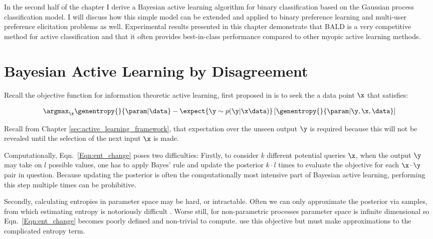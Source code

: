 In the second half of the chapter I derive a Bayesian active learning algorithm for binary classification based on the Gaussian process classification model. I will discuss how this simple model can be extended and applied to binary preference learning and multi-user preference elicitation problems as well. Experimental results presented in this chapter demonstrate that BALD is a very competitive method for active classification and that it often provides best-in-class performance compared to other myopic active learning methods.

\section{Bayesian Active Learning by Disagreement}

Recall the objective function for information theoretic active learning, first proposed in \citep{lindley1956} is to seek the a data point $\x$ that satisfies:

\begin{align}	
	\label{Eqn:ent_change}
	\argmax_{\x} \genentropy{}{\param | \data} - \expect{\y\sim p(\y|\x\data)} \left[ \genentropy{}{\param| \y, \x,\data} \right] 
\end{align}

Recall from Chapter \ref{sec:active_learning_framework}, that expectation over the unseen output $\y$ is required because this will not be revealed until the selection of the next input $\x$ is made.

Computationally, Eqn.\ \eqref{Eqn:ent_change} poses two difficulties: Firstly, to consider $k$ different potential queries $\x$, when the output $\y$ may take on $l$ possible values, one has to apply Bayes' rule and update the posterior $k\cdot l$ times to evaluate the objective for each $\x$--$\y$ pair in question. Because updating the posterior is often the computationally most intensive part of Bayesian active learning, performing this step multiple times can be prohibitive.

Secondly, calculating entropies in parameter space may be hard, or intractable. Often we can only approximate the posterior via samples, from which estimating entropy is notoriously difficult \citep{panzeri2007}. Worse still, for non-parametric processes parameter space is infinite dimensional so Eqn.\ \eqref{Eqn:ent_change} becomes poorly defined and non-trivial to compute. \citep{MacKay1992, Krishnapuram2004, Lawrence2004} use this objective but must make approximations to the complicated entropy term.

